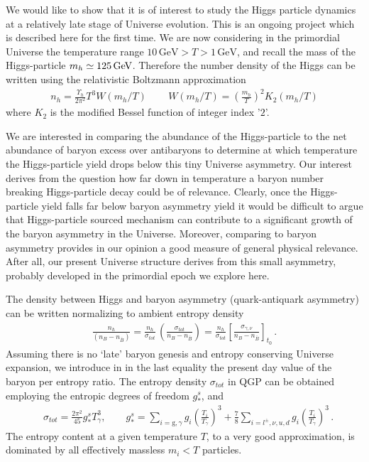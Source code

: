 We would like to show that it is of interest to study the Higgs particle dynamics at a relatively late stage of Universe evolution. This is an ongoing project which is described here for the first time. We are now considering in the primordial Universe the temperature range $10\,\mathrm{GeV}>T>1\,\mathrm{GeV}$, and recall the mass of the Higgs-particle $m_h\simeq 125\text{\,GeV}$. Therefore the number density of the Higgs can be written using the relativistic Boltzmann approximation
\begin{align}\label{DensityH}
n_{h}=\frac{\Upsilon_h}{2\pi^2}T^3W(m_h/T)\,\qquad W(m_h/T)=\left(\frac{m_h}{T}\right)^2 K_2(m_h/T)
\end{align}
where $K_2$ is the modified Bessel function of integer index '$2$'.

We are interested in comparing the abundance of the Higgs-particle to the net abundance of baryon excess over antibaryons to determine at which temperature the Higgs-particle yield drops below this tiny Universe asymmetry. Our interest derives from the question how far down in temperature a baryon number breaking Higgs-particle decay could be of relevance. Clearly, once the Higgs-particle yield falls far below baryon asymmetry yield it would be difficult to argue that Higgs-particle sourced mechanism can contribute to a significant growth of the baryon asymmetry in the Universe. Moreover, comparing to baryon asymmetry provides in our opinion a good measure of general physical relevance. After all, our present Universe structure derives from this small asymmetry, probably developed in the primordial epoch we explore here. 
 
The density between Higgs and baryon asymmetry (quark-antiquark asymmetry) can be written normalizing to ambient entropy density
\begin{align}
\frac{n_h}{(n_B-n_{\bar{B}})}=\frac{n_{h}}{\sigma_{tot}}\,\left(\frac{\sigma_{tot}}{n_B-n_{\bar{B}}}\right)=
\frac{n_{h}}{\sigma_{tot}}\left[\frac{\sigma_{\gamma,\nu}}{n_B-n_{\bar{B}}}\right]_{t_0}\,.
\end{align}
Assuming there is no `late' baryon genesis and entropy conserving Universe expansion, we introduce in  in the last equality the present day value of the baryon per entropy ratio. The entropy density $\sigma_{tot}$ in QGP can be obtained employing the entropic degrees of freedom $g^s_\ast$,  and~
\begin{align}
 &\sigma_{tot}=\frac{2\pi^2}{45}g^s_\ast T_\gamma^3,\qquad g^s_\ast=\sum_{i=\mathrm{g},\gamma}g_i\left({\frac{T_i}{T_\gamma}}\right)^3+\frac{7}{8}\sum_{i=l^\pm,\nu,u,d}g_i\left({\frac{T_i}{T_\gamma}}\right)^3\,.
\end{align}
The entropy content at a given temperature $T$, to a very good approximation, is dominated by all effectively massless $m_i<T$ particles. 

